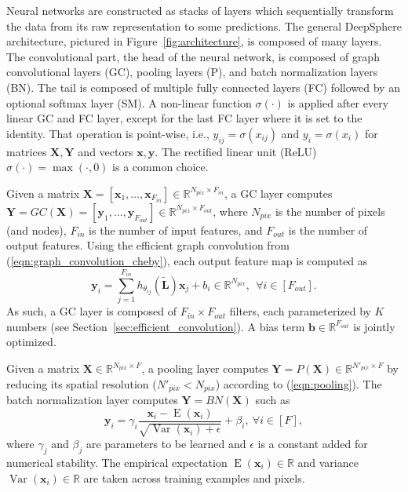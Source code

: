 \documentclass[final,twocolumn,3p,times,sort&compress]{elsarticle}
\newcommand{\figref}[1]{Figure~\ref{fig:#1}}
\newcommand{\secref}[1]{Section~\ref{sec:#1}}
\newcommand{\eqnref}[1]{(\ref{eqn:#1})}
\renewcommand{\b}[1]{{\bm{#1}}}   %
\newcommand{\1}{\b{1}}              %
\newcommand{\0}{\b{0}}              %
\renewcommand{\L}{\b{L}}
\newcommand{\tL}{\tilde{\L}}
\newcommand{\x}{\b{x}}
\newcommand{\X}{\b{X}}
\newcommand{\y}{\b{y}}
\newcommand{\Y}{\b{Y}}
\newcommand{\R}{\mathbb{R}}
\DeclareMathOperator*{\esp}{E}
\DeclareMathOperator*{\var}{Var}
\begin{document}
Neural networks are constructed as stacks of layers which sequentially transform the data from its raw representation to some predictions.
The general DeepSphere architecture, pictured in \figref{architecture}, is composed of many layers. The convolutional part, the head of the neural network, is composed of graph convolutional layers (GC), pooling layers (P), and batch normalization layers (BN). The tail is composed of multiple fully connected layers (FC) followed by an optional softmax layer (SM).
A non-linear function $\sigma(\cdot)$ is applied after every linear GC and FC layer, except for the last FC layer where it is set to the identity. That operation is point-wise, i.e., $y_{ij} = \sigma(x_{ij})$ and $y_i = \sigma(x_i)$ for matrices $\X, \Y$ and vectors $\x, \y$. The rectified linear unit (ReLU) $\sigma(\cdot) = \max(\cdot, 0)$ is a common choice.

Given a matrix $\X = [\x_1, \ldots, \x_{F_{in}}] \in \R^{N_{pix} \times F_{in}}$, a GC layer computes $\Y = GC(\X) = [\y_1, \ldots, \y_{F_{out}}] \in \R^{N_{pix} \times F_{out}}$, where $N_{pix}$ is the number of pixels (and nodes), $F_{in}$ is the number of input features, and $F_{out}$ is the number of output features.
Using the efficient graph convolution from \eqnref{graph_convolution_cheby}, each output feature map is computed as
\begin{equation*}
	\y_i = \sum_{j=1}^{F_{in}} h_{\theta_{ij}}(\tL) \x_j + b_i \in \R^{N_{pix}}, \ \ \forall i \in [F_{out}].
\end{equation*}
As such, a GC layer is composed of $F_{in} \times F_{out}$ filters, each parameterized by $K$ numbers (see \secref{efficient_convolution}). A bias term $\b b \in \R^{F_{out}}$ is jointly optimized.

Given a matrix $\X \in \R^{N_{pix} \times F}$, a pooling layer computes $\Y = P(\X) \in \R^{N'_{pix} \times F}$ by reducing its spatial resolution ($N'_{pix} < N_{pix}$) according to \eqnref{pooling}.
The batch normalization layer \citep{ioffe2015batchnorm} computes $\Y = BN(\X)$ such as
\begin{equation*}
	\y_i = \gamma_i \frac{\x_i - \esp(\x_i)}{\sqrt{\var(\x_i) + \epsilon}} + \beta_i, \ \forall i \in [F],
\end{equation*}
where $\gamma_{j}$ and $\beta_{j}$ are parameters to be learned and $\epsilon$ is a constant added for numerical stability. The empirical expectation $\esp(\x_i) \in \R$ and variance $\var(\x_i) \in \R$ are taken across training examples and pixels.
\end{document}
